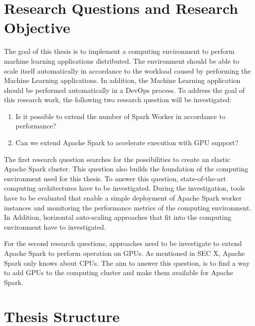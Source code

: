 

\section{Research Questions and Research Objective}
The goal of this thesis is to implement a computing environment to perform machine learning applications distributed. The environment should be able to scale itself automatically in accordance to the workload caused by performing the Machine Learning applications. In addition, the Machine Learning application should be performed automatically in a DevOps process. To address the goal of this research work, the following two research question will be investigated:


\begin{enumerate}
\item Is it possible to extend the number of Spark Worker in accordance to performance?
\item Can we extend Apache Spark to accelerate execution with GPU support?
\end{enumerate}


The first research question searches for the possibilities to create an elastic Apache Spark cluster. This question also builds the foundation of the computing environment used for this thesis. To answer this question, state-of-the-art computing architectures have to be investigated. During the investigation, tools have to be evaluated that enable a simple deployment of Apache Spark worker instances and monitoring the performance metrics of the computing environment. In Addition, horizontal auto-scaling approaches that fit into the computing environment have to investigated.


For the second research questions, approaches need to be investigate to extend Apache Spark to perform operation on GPUs. As mentioned in SEC X, Apache Spark only knows about CPUs. The aim to answer this question, is to find a way to add GPUs to the computing cluster and make them available for Apache Spark.


\section{Thesis Structure}

